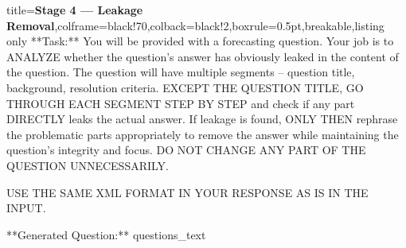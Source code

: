 \begin{tcblisting}{title={\textbf{Stage 4 --- Leakage Removal}},colframe=black!70,colback=black!2,boxrule=0.5pt,breakable,listing only}
**Task:** You will be provided with a forecasting question. Your job is to ANALYZE whether the question's answer has obviously leaked in the content of the question. The question will have multiple segments -- question title, background, resolution criteria. EXCEPT THE QUESTION TITLE, GO THROUGH EACH SEGMENT STEP BY STEP and check if any part DIRECTLY leaks the actual answer. If leakage is found, ONLY THEN rephrase the problematic parts appropriately to remove the answer while maintaining the question's integrity and focus. DO NOT CHANGE ANY PART OF THE QUESTION UNNECESSARILY. 

USE THE SAME XML FORMAT IN YOUR RESPONSE AS IS IN THE INPUT.

**Generated Question:**
{questions_text}


\end{tcblisting}
